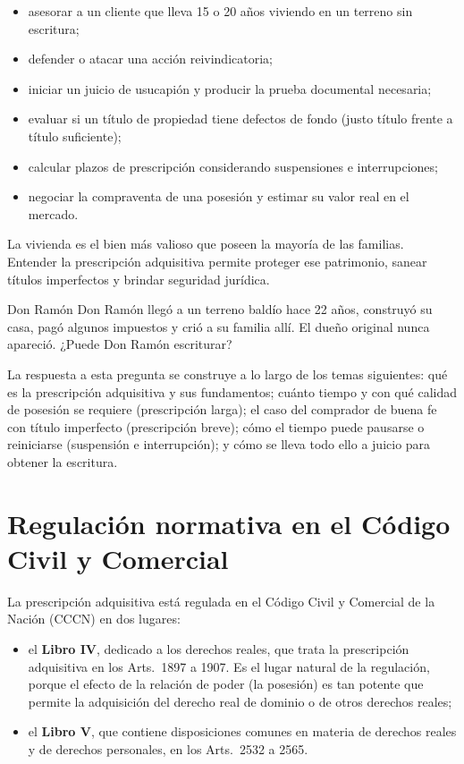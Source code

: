 \documentclass[12pt,oneside]{book}
\begin{document}
\begin{itemize}
    \item asesorar a un cliente que lleva 15 o 20 años viviendo en un terreno sin escritura;
    \item defender o atacar una acción reivindicatoria;
    \item iniciar un juicio de usucapión y producir la prueba documental necesaria;
    \item evaluar si un título de propiedad tiene defectos de fondo (justo título frente a título suficiente);
    \item calcular plazos de prescripción considerando suspensiones e interrupciones;
    \item negociar la compraventa de una posesión y estimar su valor real en el mercado.
\end{itemize}

La vivienda es el bien más valioso que poseen la mayoría de las familias. Entender la prescripción adquisitiva permite proteger ese patrimonio, sanear títulos imperfectos y brindar seguridad jurídica.

\begin{example}{Don Ramón}
Don Ramón llegó a un terreno baldío hace 22 años, construyó su casa, pagó algunos impuestos y crió a su familia allí. El dueño original nunca apareció. ¿Puede Don Ramón escriturar?

La respuesta a esta pregunta se construye a lo largo de los temas siguientes: qué es la prescripción adquisitiva y sus fundamentos; cuánto tiempo y con qué calidad de posesión se requiere (prescripción larga); el caso del comprador de buena fe con título imperfecto (prescripción breve); cómo el tiempo puede pausarse o reiniciarse (suspensión e interrupción); y cómo se lleva todo ello a juicio para obtener la escritura.
\end{example}

\section{Regulación normativa en el Código Civil y Comercial}

La prescripción adquisitiva está regulada en el Código Civil y Comercial de la Nación (CCCN) en dos lugares:

\begin{itemize}
    \item el \textbf{Libro IV}, dedicado a los derechos reales, que trata la prescripción adquisitiva en los Arts.~1897 a 1907. Es el lugar natural de la regulación, porque el efecto de la relación de poder (la posesión) es tan potente que permite la adquisición del derecho real de dominio o de otros derechos reales;
    \item el \textbf{Libro V}, que contiene disposiciones comunes en materia de derechos reales y de derechos personales, en los Arts.~2532 a 2565.
\end{itemize}
\end{document}
